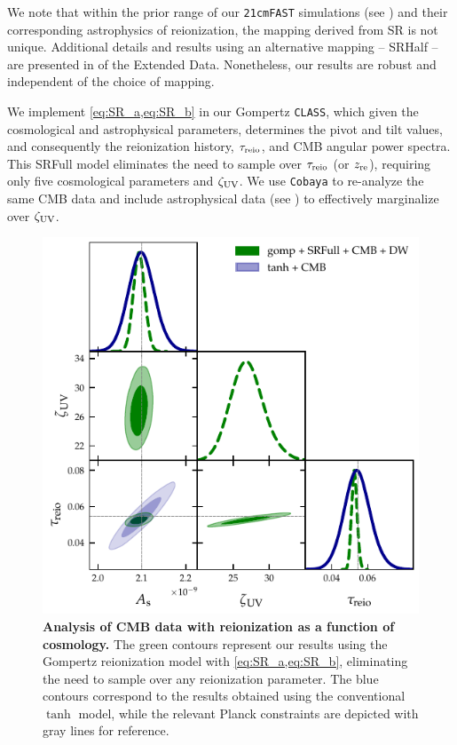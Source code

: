 We note that within the prior range of our \texttt{21cmFAST} simulations
(see ) and their corresponding astrophysics of
reionization, the mapping derived from SR is not unique.
Additional details and results using an alternative mapping -- SRHalf -- are
presented in  of the Extended Data.
Nonetheless, our results are robust and independent of the choice of
mapping.

We implement \cref{eq:SR_a,eq:SR_b} in our Gompertz \texttt{CLASS}, which given
the cosmological and astrophysical parameters, determines the pivot and tilt values, 
and consequently the reionization history, $\tau_{\mathrm{reio}}$, 
and CMB angular power spectra.
This SRFull model eliminates the need to sample over $\tau_{\mathrm{reio}}$ (or $z_{\mathrm{re}}$),
requiring only five cosmological parameters and $\zeta_\mathrm{UV}$. 
We use \texttt{Cobaya} to re-analyze the same CMB data and
include astrophysical data (see ) to effectively
marginalize over $\zeta_\mathrm{UV}$.

\begin{figure}[tb]
\centering
\includegraphics[width=0.7\linewidth]{figs/gomp1dw_tanh_triangle_kill.pdf}
\caption{\textbf{Analysis of CMB data with reionization as a function of
cosmology.}
The green contours represent our results using the Gompertz reionization
model with \cref{eq:SR_a,eq:SR_b}, eliminating the need to sample over any
reionization parameter.
The blue contours correspond to the results obtained using the
conventional $\tanh$ model, while the relevant Planck constraints
\cite{Planck2020a} are depicted with gray lines for reference.}
\label{fig:kill}
\end{figure}


